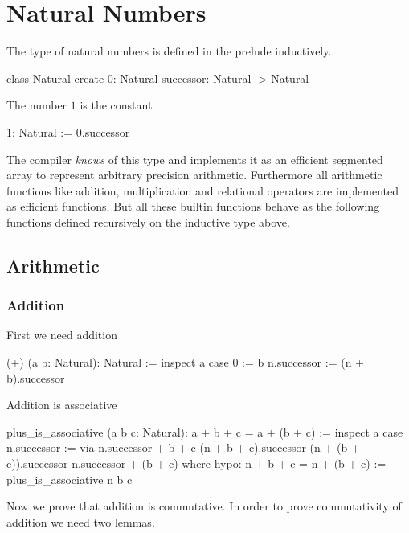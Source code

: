 \section{Natural Numbers}


The type of natural numbers is defined in the prelude inductively.

\begin{alba}
  class Natural create
    0: Natural
    successor: Natural -> Natural
\end{alba}

The number $1$ is the constant

\begin{alba}
  1: Natural := 0.successor
\end{alba}

The compiler \emph{knows} of this type and implements it as an efficient
segmented array to represent arbitrary precision arithmetic. Furthermore all
arithmetic functions like addition, multiplication and relational operators
are implemented as efficient functions. But all these builtin functions behave
as the following functions defined recursively on the inductive type above.





\subsection{Arithmetic}


\subsubsection{Addition}


First we need addition
\begin{alba}
  (+) (a b: Natural): Natural :=
    inspect a case
      0 :=
        b
      n.successor :=
        (n + b).successor
\end{alba}


Addition is associative
%
\begin{alba}
  plus_is_associative (a b c: Natural): a + b + c = a + (b + c) :=
    inspect a case
      n.successor :=
        via
          n.successor + b + c
          (n + b + c).successor
          (n + (b + c)).successor
          n.successor + (b + c)
        where
          hypo: n + b + c = n + (b + c) :=
            plus_is_associative n b c
\end{alba}

Now we prove that addition is commutative. In order to prove commutativity of
addition we need two lemmas.

